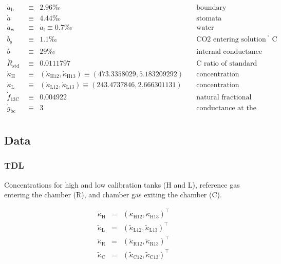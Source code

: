 \documentclass[]{article}
\begin{document}
\[
\begin{aligned}
\dot{a}_{\textrm{b}}
  & \equiv & 2.96 ‰
  & \quad\textrm{boundary} \\
\dot{a}
  & \equiv & 4.44 ‰
  & \quad\textrm{stomata}  \\
\dot{a}_{\textrm{w}}
  & \equiv & \dot{a}_{\textrm{l}}\equiv 0.7 ‰
  & \quad\textrm{water}    \\
\dot{b}_{\textrm{s}}
  & \equiv &  1.1 ‰
  & \quad\textrm{CO2 entering solution at 20$^°$ C} \\
\dot{b}
  & \equiv &  29 ‰
  & \quad\textrm{internal conductance via gm} \\
\dot{R}_\textrm{std 13C}
  & \equiv &  0.0111797
  & \quad\textrm{C ratio of standard} \\
{\dot{\kappa}}_{\textrm{H}}
  & \equiv &  (\dot{\kappa}_{\textrm{H}12}, \dot{\kappa}_{\textrm{H}13})  \equiv (473.3358029, 5.183209292)
  & \quad\textrm{concentration constants for high tanks} \\
{\dot{\kappa}}_{\textrm{L}}
  & \equiv &  (\dot{\kappa}_{\textrm{L}12}, \dot{\kappa}_{\textrm{L}13})  \equiv (243.4737846, 2.666301131)
  & \quad\textrm{concentration constants for low  tanks} \\
\dot{f}_{\textrm{13C}}
  & \equiv &  0.004922
  & \quad\textrm{natural fractional abundance of C isotopologues not measured} \\
\dot{g}_{\textrm{bc}}
  & \equiv &  3
  & \quad\textrm{conductance at the boundary level, can also be obtained from Licor} \\
\end{aligned}
\]

\hypertarget{data}{%
\subsection{Data}\label{data}}

\hypertarget{tdl}{%
\subsubsection{TDL}\label{tdl}}

Concentrations for high and low calibration tanks (H and L), reference
gas entering the chamber (R), and chamber gas exiting the chamber (C).

\[
\begin{aligned}
\tilde{{\kappa}}_{\textrm{H}}
  & = & (\tilde{\kappa}_{\textrm{H}12},\tilde{\kappa}_{\textrm{H}13})^\top\\
\tilde{{\kappa}}_{\textrm{L}}
  & = & (\tilde{\kappa}_{\textrm{L}12},\tilde{\kappa}_{\textrm{L}13})^\top\\
\tilde{{\kappa}}_{\textrm{R}}
  & = & (\tilde{\kappa}_{\textrm{R}12},\tilde{\kappa}_{\textrm{R}13})^\top\\
\tilde{{\kappa}}_{\textrm{C}}
  & = & (\tilde{\kappa}_{\textrm{C}12},\tilde{\kappa}_{\textrm{C}13})^\top\\
\end{aligned}
\]
\end{document}
